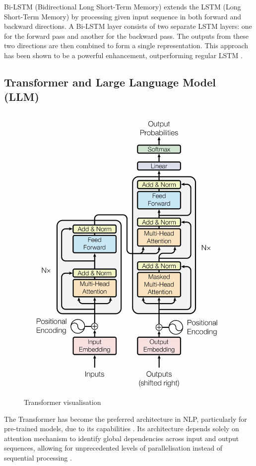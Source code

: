 Bi-LSTM (Bidirectional Long Short-Term Memory) extends the LSTM (Long Short-Term Memory) by processing given input sequence in both forward and backward directions. A Bi-LSTM layer consists of two separate LSTM layers: one for the forward pass and another for the backward pass. The outputs from these two directions are then combined to form a single representation. This approach has been shown to be a powerful enhancement, outperforming regular LSTM \cite{graves-2005-bilstm}.

\subsection{Transformer and Large Language Model (LLM)}

\begin{figure}[htbp]
    \centering
    \includegraphics[width=0.65\linewidth]{images/transformer.png}
    \caption{Transformer visualisation \cite{vaswani-2023-attention}}
    \label{fig:transformer}
\end{figure}

The Transformer has become the preferred architecture in NLP, particularly for pre-trained models, due to its capabilities \cite{lin-2022-survey-transformers}. Its architecture depends solely on attention mechanism to identify global dependencies across input and output sequences, allowing for unprecedented levels of parallelisation instead of sequential processing \cite{vaswani-2023-attention}.

